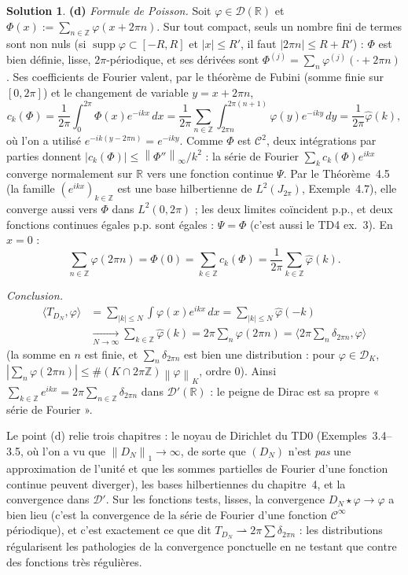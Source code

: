 \documentclass[11pt,a4paper]{article}
\newcommand{\R}{\mathbb{R}}
\newcommand{\Z}{\mathbb{Z}}
\newcommand{\norm}[1]{\left\|#1\right\|}
\DeclareMathOperator{\supp}{supp}
\newcommand{\D}{\mathcal{D}}
\theoremstyle{definition}
\newtheorem*{solution}{Solution}
\begin{document}
\begin{solution}
\medskip
\noindent\textbf{(d)} \emph{Formule de Poisson.} Soit $\varphi\in\D(\R)$ et $\Phi(x):=\sum_{n\in\Z}\varphi(x+2\pi n)$. Sur tout compact, seuls un nombre fini de termes sont non nuls (si $\supp\varphi\subset[-R,R]$ et $|x|\le R'$, il faut $|2\pi n|\le R+R'$) : $\Phi$ est bien définie, lisse, $2\pi$-périodique, et ses dérivées sont $\Phi^{(j)}=\sum_n\varphi^{(j)}(\cdot+2\pi n)$. Ses coefficients de Fourier valent, par le théorème de Fubini (somme finie sur $[0,2\pi]$) et le changement de variable $y=x+2\pi n$,
\[
c_k(\Phi)=\frac1{2\pi}\int_0^{2\pi}\Phi(x)e^{-ikx}\,dx=\frac1{2\pi}\sum_{n\in\Z}\int_{2\pi n}^{2\pi(n+1)}\varphi(y)e^{-iky}\,dy=\frac1{2\pi}\hat\varphi(k),
\]
où l'on a utilisé $e^{-ik(y-2\pi n)}=e^{-iky}$. Comme $\Phi$ est $\mathcal C^2$, deux intégrations par parties donnent $|c_k(\Phi)|\le\norm{\Phi''}_\infty/k^2$ : la série de Fourier $\sum_kc_k(\Phi)e^{ikx}$ converge normalement sur $\R$ vers une fonction continue $\Psi$. Par le Théorème~4.5 (la famille $(e^{ikx})_{k\in\Z}$ est une base hilbertienne de $L^2(J_{2\pi})$, Exemple~4.7), elle converge aussi vers $\Phi$ dans $L^2(0,2\pi)$ ; les deux limites coïncident p.p., et deux fonctions continues égales p.p. sont égales : $\Psi=\Phi$ (c'est aussi le TD4 ex.~3). En $x=0$ :
\[
\sum_{n\in\Z}\varphi(2\pi n)=\Phi(0)=\sum_{k\in\Z}c_k(\Phi)=\frac1{2\pi}\sum_{k\in\Z}\hat\varphi(k).
\]

\emph{Conclusion.}
\[
\begin{aligned}
\langle T_{D_N},\varphi\rangle&=\sum_{|k|\le N}\int\varphi(x)e^{ikx}\,dx=\sum_{|k|\le N}\hat\varphi(-k)\\
&\xrightarrow[N\to\infty]{}\sum_{k\in\Z}\hat\varphi(k)=2\pi\sum_n\varphi(2\pi n)=\Big\langle2\pi\sum_n\delta_{2\pi n},\varphi\Big\rangle
\end{aligned}
\]
(la somme en $n$ est finie, et $\sum_n\delta_{2\pi n}$ est bien une distribution : pour $\varphi\in\D_K$, $|\sum_n\varphi(2\pi n)|\le\#(K\cap2\pi\Z)\norm\varphi_K$, ordre $0$). Ainsi $\sum_{k\in\Z}e^{ikx}=2\pi\sum_{n\in\Z}\delta_{2\pi n}$ dans $\D'(\R)$ : le peigne de Dirac est sa propre « série de Fourier ».
\end{solution}

\begin{commentaire}
Le point (d) relie trois chapitres : le noyau de Dirichlet du TD0 (Exemples~3.4--3.5, où l'on a vu que $\norm{D_N}_1\to\infty$, de sorte que $(D_N)$ n'est \emph{pas} une approximation de l'unité et que les sommes partielles de Fourier d'une fonction continue peuvent diverger), les bases hilbertiennes du chapitre~4, et la convergence dans $\D'$. Sur les fonctions tests, lisses, la convergence $D_N\star\varphi\to\varphi$ a bien lieu (c'est la convergence de la série de Fourier d'une fonction $\mathcal C^\infty$ périodique), et c'est exactement ce que dit $T_{D_N}\rightharpoonup2\pi\sum\delta_{2\pi n}$ : les distributions régularisent les pathologies de la convergence ponctuelle en ne testant que contre des fonctions très régulières.
\end{commentaire}
\end{document}
